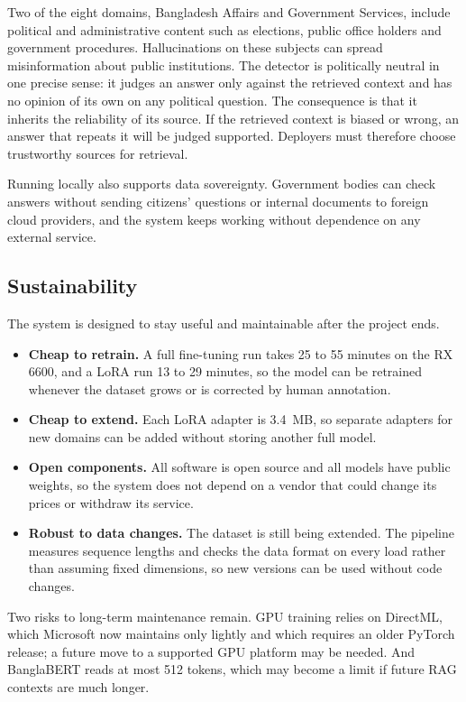Two of the eight domains, Bangladesh Affairs and Government Services, include
political and administrative content such as elections, public office holders
and government procedures. Hallucinations on these subjects can spread
misinformation about public institutions. The detector is politically neutral
in one precise sense: it judges an answer only against the retrieved context
and has no opinion of its own on any political question. The consequence is
that it inherits the reliability of its source. If the retrieved context is
biased or wrong, an answer that repeats it will be judged supported. Deployers
must therefore choose trustworthy sources for retrieval.

Running locally also supports data sovereignty. Government bodies can check
answers without sending citizens' questions or internal documents to foreign
cloud providers, and the system keeps working without dependence on any
external service.

\subsection{Sustainability}

The system is designed to stay useful and maintainable after the project ends.
\begin{itemize}
  \item \textbf{Cheap to retrain.} A full fine-tuning run takes 25 to 55 minutes
  on the RX 6600, and a LoRA run 13 to 29 minutes, so the model can be retrained
  whenever the dataset grows or is corrected by human annotation.
  \item \textbf{Cheap to extend.} Each LoRA adapter is 3.4~MB, so separate
  adapters for new domains can be added without storing another full model.
  \item \textbf{Open components.} All software is open source and all models
  have public weights, so the system does not depend on a vendor that could
  change its prices or withdraw its service.
  \item \textbf{Robust to data changes.} The dataset is still being extended.
  The pipeline measures sequence lengths and checks the data format on every
  load rather than assuming fixed dimensions, so new versions can be used
  without code changes.
\end{itemize}

Two risks to long-term maintenance remain. GPU training relies on DirectML,
which Microsoft now maintains only lightly and which requires an older PyTorch
release; a future move to a supported GPU platform may be needed. And
BanglaBERT reads at most 512 tokens, which may become a limit if future RAG
contexts are much longer.

